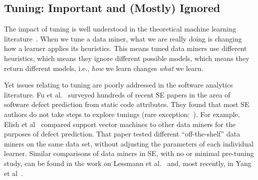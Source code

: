 \documentclass[twocolumn,5p,sort&compress]{elsarticle}
\theoremstyle{break}
\begin{document}



\subsection{Tuning: Important and (Mostly) Ignored}
\label{sect:tune}

The impact of tuning is well understood in the theoretical machine learning literature~\cite{bergstra2012random}.  When we tune a
data miner, what we are really doing is changing how a learner applies its
heuristics. This means tuned data miners use different heuristics, which means
they ignore different possible models, which means they return different models,
i.e., \textit{how} we learn changes \textit{what} we learn.

Yet issues relating to
tuning are poorly addressed in the software analytics literature.  Fu et al.~\cite{fu2016tuning} surveyed hundreds of recent SE papers in the area
of software defect prediction from static code attributes. They found that most SE
  authors do not take steps to explore tunings (rare exception:~\cite{tantithamthavorn2016icse}). For example, Elish et
  al~\cite{elish2008predicting} compared support vector machines to other data
  miners for the purposes of defect prediction. That paper tested different
  ``off-the-shelf'' data miners on the same data set, without adjusting the
  parameters of each individual learner. Similar comparisons of data miners in SE,
with no or minimal pre-tuning study, can be found in the work on Lessmann et al.~\cite{lessmann2008benchmarking}
and, most recently, in Yang et al~\cite{yang2016effort}.  
\end{document}
